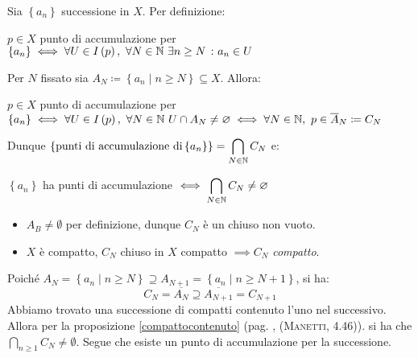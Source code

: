 \begin{demonstration}
Sia	$\left\{a_n\right\}$ successione in $X$. Per definizione:
\begin{center}
$p\in X$ punto di accumulazione per $\left\{a_n\right\}\iff \forall U\in I\left(p\right),\ \forall N\in\mathbb{N}\ \exists n\geq N\ \colon a_n\in U$
\end{center}
Per $N$ fissato sia $A_N\coloneqq \left\{a_n\mid n\geq N\right\}\subseteq X$. Allora:
\begin{center}
	$p\in X$ punto di accumulazione per $\displaystyle\left\{a_n\right\}\iff \forall U\in I\left(p\right),\ \forall N\in\mathbb{N}\ U\cap A_N\neq\varnothing\iff \forall N\in\mathbb{N},\ p\in\overline{A}_N\coloneqq C_N$
\end{center}
Dunque $\displaystyle\left\{\text{punti di accumulazione di} \left\{a_n\right\}\right\}=\bigcap_{N\in\mathbb{N}}C_N$ e:
 \begin{center}
 	$\left\{a_n\right\}$ ha punti di accumulazione $\displaystyle\iff \bigcap_{N\in\mathbb{N}}C_N\neq\varnothing$
 \end{center}
\begin{itemize}
	\item $A_B\neq \emptyset$ per definizione, dunque $C_N$ è un chiuso non vuoto.
	\item $X$ è compatto, $C_N$ chiuso in $X$ compatto $\implies C_N$ \textit{compatto}.
\end{itemize}
Poiché $A_N=\left\{a_n\mid n\geq N\right\}\supseteq A_ {N+1}=\left\{a_n\mid n\geq N+1\right\}$, si ha:
\begin{equation*}
C_N=\overline{A_N}\supseteq \overline{A_{N+1}}=C_{N+1}
\end{equation*}
Abbiamo trovato una successione di compatti contenuto l'uno nel successivo. Allora per la proposizione \ref{compattocontenuto} (pag. \pageref{compattocontenuto}, \textsc{(Manetti, 4.46)}). si ha che $\displaystyle\bigcap_{n\geq 1}C_N\neq \emptyset$.
Segue che esiste un punto di accumulazione per la successione.
\end{demonstration}
